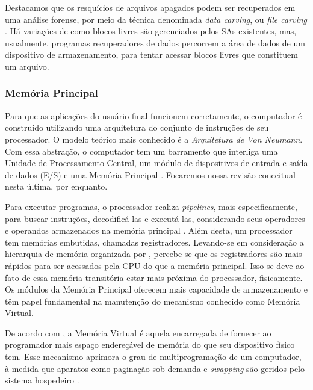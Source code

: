     \vspace{4mm}

    \hspace{1cm}
    Destacamos que os resquícios de arquivos apagados podem ser recuperados em uma análise forense, por meio da técnica denominada \textit{data carving}, ou \textit{file carving} \cite{carrier2005}. Há variações de como blocos livres são gerenciados pelos SAs existentes, mas, usualmente, programas recuperadores de dados percorrem a área de dados de um dispositivo de armazenamento, para tentar acessar blocos livres que constituem um arquivo.
    
    \subsubsection{Memória Principal}
    
    \hspace{1cm}
    Para que as aplicações do usuário final funcionem corretamente, o computador é construído utilizando uma arquitetura do conjunto de instruções de seu processador. O modelo teórico mais conhecido é a \textit{Arquitetura de Von Neumann}. Com essa abstração, o computador tem um barramento que interliga uma Unidade de Processamento Central, um módulo de dispositivos de entrada e saída de dados (E/S) e uma Memória Principal \cite{stallings2009}. Focaremos nossa revisão conceitual nesta última, por enquanto.
    
    \vspace{4mm}
    
    \hspace{1cm}
    Para executar programas, o processador realiza \textit{pipelines}, mais especificamente, para buscar instruções, decodificá-las e executá-las, considerando seus operadores e operandos armazenados na memória principal \cite{stallings2009}. Além desta, um processador tem memórias embutidas, chamadas registradores. Levando-se em consideração a hierarquia de memória organizada por , percebe-se que os registradores são mais rápidos para ser acessados pela CPU do que a memória principal. Isso se deve ao fato de essa memória transitória estar mais próxima do processador, fisicamente. Os módulos da Memória Principal oferecem mais capacidade de armazenamento e têm papel fundamental na manutenção do mecanismo conhecido como Memória Virtual.
        
    \vspace{4mm}

    \hspace{1cm}
    De acordo com , a Memória Virtual é aquela encarregada de fornecer ao programador mais espaço endereçável de memória do que seu dispositivo físico tem. Esse mecanismo aprimora o grau de multiprogramação de um computador, à medida que aparatos como paginação sob demanda e \textit{swapping} são geridos pelo sistema hospedeiro \cite{silberschatz2018}.
    
